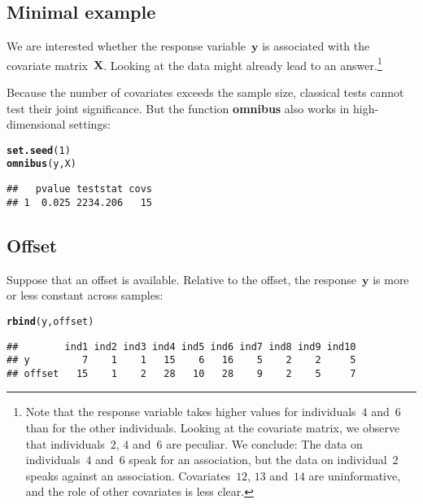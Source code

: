 \documentclass{article}\usepackage[]{graphicx}\usepackage[]{color}
\makeatletter
\newcommand{\hlnum}[1]{\textcolor[rgb]{0.686,0.059,0.569}{#1}}%
\newcommand{\hlstd}[1]{\textcolor[rgb]{0.345,0.345,0.345}{#1}}%
\newcommand{\hlkwd}[1]{\textcolor[rgb]{0.737,0.353,0.396}{\textbf{#1}}}%
\newenvironment{kframe}{%
 \def\at@end@of@kframe{}%
 \ifinner\ifhmode%
  \def\at@end@of@kframe{\end{minipage}}%
  \begin{minipage}{\columnwidth}%
 \fi\fi%
 \def\FrameCommand##1{\hskip\@totalleftmargin \hskip-\fboxsep
 \colorbox{shadecolor}{##1}\hskip-\fboxsep
     \hskip-\linewidth \hskip-\@totalleftmargin \hskip\columnwidth}%
 \MakeFramed {\advance\hsize-\width
   \@totalleftmargin\z@ \linewidth\hsize
   \@setminipage}}%
 {\par\unskip\endMakeFramed%
 \at@end@of@kframe}
\newenvironment{knitrout}{}{} %
\makeatother
\begin{document}
\subsection{Minimal example}
\label{TOA Minimal example}

We are interested whether the response variable~$\boldsymbol{y}$ is associated with the covariate matrix~$\boldsymbol{X}$. Looking at the data might already lead to an answer.\footnote{Note that the response variable takes higher values for individuals~$4$ and~$6$ than for the other individuals. Looking at the covariate matrix, we observe that individuals~$2$, $4$ and~$6$ are peculiar.
We conclude: The data on individuals~$4$ and~$6$ speak for an association, but the data on individual~$2$ speaks against an association. Covariates~$12$, $13$ and~$14$ are uninformative, and the role of other covariates is less clear.}

Because the number of covariates exceeds the sample size, classical tests cannot test their joint significance. But the function \textbf{omnibus} also works in high-dimensional settings:
\begin{knitrout}
\color{fgcolor}\begin{kframe}
\begin{alltt}
\hlkwd{set.seed}\hlstd{(}\hlnum{1}\hlstd{)}
\hlkwd{omnibus}\hlstd{(y,X)}
\end{alltt}
\begin{verbatim}
##   pvalue teststat covs
## 1  0.025 2234.206   15
\end{verbatim}
\end{kframe}
\end{knitrout}

\newpage

\subsection{Offset}
\label{TOA Offset}

Suppose that an offset is available. Relative to the offset, the response~$\boldsymbol{y}$ is more or less constant across samples:
\begin{knitrout}
\color{fgcolor}\begin{kframe}
\begin{alltt}
\hlkwd{rbind}\hlstd{(y,offset)}
\end{alltt}
\begin{verbatim}
##        ind1 ind2 ind3 ind4 ind5 ind6 ind7 ind8 ind9 ind10
## y         7    1    1   15    6   16    5    2    2     5
## offset   15    1    2   28   10   28    9    2    5     7
\end{verbatim}
\end{kframe}
\end{knitrout}
\end{document}
